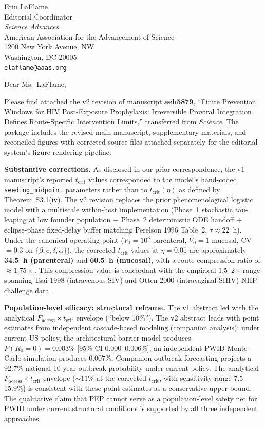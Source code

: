 \documentclass[11pt]{letter}
\begin{document}
\begin{letter}{Erin LaFlame\\
Editorial Coordinator\\
\textit{Science Advances}\\
American Association for the Advancement of Science\\
1200 New York Avenue, NW\\
Washington, DC 20005\\
\texttt{elaflame@aaas.org}}

\opening{Dear Ms.\ LaFlame,}

Please find attached the v2 revision of manuscript \textbf{aeh5879}, ``Finite Prevention Windows for HIV Post-Exposure Prophylaxis: Irreversible Proviral Integration Defines Route-Specific Intervention Limits,'' transferred from \textit{Science}. The package includes the revised main manuscript, supplementary materials, and reconciled figures with corrected source files attached separately for the editorial system's figure-rendering pipeline.

\textbf{Substantive corrections.} As disclosed in our prior correspondence, the v1 manuscript's reported $t_{\text{crit}}$ values corresponded to the model's hand-coded \texttt{seeding\_midpoint} parameters rather than to $t_{\text{crit}}(\eta)$ as defined by Theorem~S3.1(iv). The v2 revision replaces the prior phenomenological logistic model with a multiscale within-host implementation (Phase~1 stochastic tau-leaping at low founder population $+$ Phase~2 deterministic ODE handoff $+$ eclipse-phase fixed-delay buffer matching Perelson 1996 Table~2, $\tau \approx 22$~h). Under the canonical operating point ($V_{0} = 10^{3}$ parenteral, $V_{0} = 1$ mucosal, CV $= 0.3$ on $\{\beta, c, \delta, \alpha\}$), the corrected $t_{\text{crit}}$ values at $\eta = 0.05$ are approximately \textbf{34.5~h (parenteral)} and \textbf{60.5~h (mucosal)}, with a route-compression ratio of $\approx 1.75\times$. This compression value is concordant with the empirical 1.5--2$\times$ range spanning Tsai 1998 (intravenous SIV) and Otten 2000 (intravaginal SHIV) NHP challenge data.

\textbf{Population-level efficacy: structural reframe.} The v1 abstract led with the analytical $F_{\text{access}} \times t_{\text{crit}}$ envelope (``below 10\%''). The v2 abstract leads with point estimates from independent cascade-based modeling (companion analysis): under current US policy, the architectural-barrier model produces $P(R_{0}=0) = 0.003\%$ [95\% CI 0.000--0.006\%]; an independent PWID Monte Carlo simulation produces $0.007\%$. Companion outbreak forecasting projects a $92.7\%$ national 10-year outbreak probability under current policy. The analytical $F_{\text{access}} \times t_{\text{crit}}$ envelope ($\sim 11\%$ at the corrected $t_{\text{crit}}$, with sensitivity range 7.5--15.9\%) is consistent with these point estimates as a conservative upper bound. The qualitative claim that PEP cannot serve as a population-level safety net for PWID under current structural conditions is supported by all three independent approaches.


\end{letter}
\end{document}
